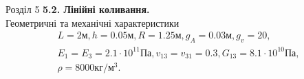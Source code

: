 \documentclass[8pt]{beamer}
\numberwithin{figure}{section}
\numberwithin{equation}{section}
\numberwithin{table}{section}
\begin{document}
\begin{frame}{Розділ 5}
\textbf{5.2. Лінійні коливання.}
\\
\vspace{1em}
Геометричні та механічні  характеристики
\begin{equation}
\begin{gathered}
L=2\text{м}, h=0.05\text{м},R=1.25\text{м},g_A=0.03\text{м}, g_v=20,\\
E_1=E_3=2.1\cdot 10^{11} Па, v_{13}=v_{31}=0.3, G_{13}=8.1\cdot 10^{10} Па,\\ \rho=8000 кг/м^3.
\end{gathered}
\end{equation}

\begin{table}[h!]
\caption{Залежність найменшої власної частоти ($\omega$) від частоти гофрування ($g_v$) панелі}
\centering
{}
\end{table}


\end{frame}
\end{document}
